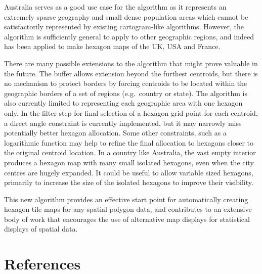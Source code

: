 Australia serves as a good use case for the algorithm as it represents an extremely sparse geography and small dense population areas which cannot be satisfactorily represented by existing cartogram-like algorithms. However, the algorithm is sufficiently general to apply to other geographic regions, and indeed has been applied to make hexagon maps of the UK, USA and France.

There are many possible extensions to the algorithm that might prove valuable in the future. The buffer allows extension beyond the furthest centroids, but there is no mechanism to protect borders by forcing centroids to be located within the geographic borders of a set of regions (e.g.~country or state). The algorithm is also currently limited to representing each geographic area with one hexagon only. In the filter step for final selection of a hexagon grid point for each centroid, a direct angle constraint is currently implemented, but it may narrowly miss potentially better hexagon allocation. Some other constraints, such as a logarithmic function may help to refine the final allocation to hexagons closer to the original centroid location. In a country like Australia, the vast empty interior produces a hexagon map with many small isolated hexagons, even when the city centres are hugely expanded. It could be useful to allow variable sized hexagons, primarily to increase the size of the isolated hexagons to improve their visibility.

This new algorithm provides an effective start point for automatically creating hexagon tile maps for any spatial polygon data, and contributes to an extensive body of work that encourages the use of alternative map displays for statistical displays of spatial data.

\hypertarget{references}{%
\section*{References}\label{references}}

